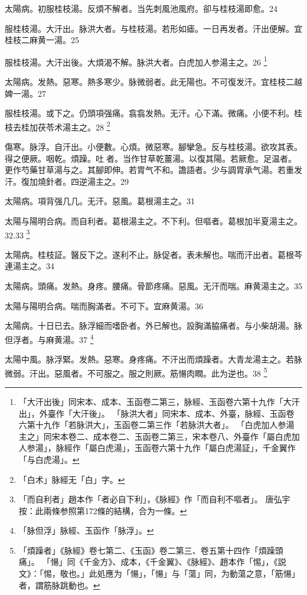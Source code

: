 太陽病。初服桂枝湯。反煩不解者。当先刺風池風府。卻与桂枝湯即愈。24

服桂枝湯。大汗出。脉洪大者。与桂枝湯。若形如瘧。一日再发者。汗出便解。宜桂枝二麻黄一湯。25

%

服桂枝湯。大汗出{\khaaitp 後}。大煩渴不解。脉洪大者。白虎{\khaaitp 加人参}湯主之。26
	\footnote{
		「大汗出後」同宋本、成本、玉函卷二第三，脉經、玉函卷六第十九作「大汗出」，外臺作「大汗後」。
		「脉洪大者」同宋本、成本、外臺，脉經、玉函卷六第十九作「若脉洪大」，玉函卷二第三作「若脉洪大者」。
		「白虎加人参湯主之」同宋本卷二、成本卷二、玉函卷二第三，宋本卷八、外臺作「屬白虎加人参湯」，脉經作「屬白虎湯」，玉函卷六第十九作「屬白虎湯証」，千金翼作「与白虎湯」。
	}

太陽病。发熱。惡寒。熱多寒少。脉微弱者。此无陽也。不可{\khaaitp 復}发汗。{\khaaitp 宜桂枝二越婢一湯。}27

服桂枝湯。{\khaaitp 或}下之。仍頭項强痛。翕翕发熱。无汗。心下滿。微痛。小便不利。桂枝去桂加茯苓术湯主之。28
	\footnote{
		「白术」脉經无「白」字。
	}

傷寒。脉浮。自汗出。小便數。心煩。微惡寒。腳攣急。反与桂枝湯。欲攻其表。得之便厥。咽乾。煩躁。吐{\sungtpii 𠱘}者。当作甘草乾薑湯。以復其陽。若厥愈。足温者。更作芍藥甘草湯与之。其腳即伸。若胃气不和。譫語者。少与{\khaaitp 調胃}承气湯。若重发汗。復加燒針者。四逆湯主之。29

太陽病。項背强几几。无汗。惡風。葛根湯主之。31

太陽与陽明合病。而自利{\khaaitp 者}。葛根湯主之。不下利。但嘔者。葛根加半夏湯主之。32.33
	\footnote{
		「而自利者」趙本作「者必自下利」，《脉經》作「而自利不嘔者」。
		唐弘宇按：此兩條参照第172條的結構，合为一條。
	}

太陽病。桂枝証。醫反下之。遂利不止。脉促者。表未解也。喘而汗出者。葛根芩連湯主之。34

太陽病。頭痛。发熱。身疼。腰痛。骨節疼痛。惡風。无汗而喘。麻黄湯主之。35

太陽与陽明合病。喘而胸滿者。不可下。宜麻黄湯。36

太陽病。十日已去。脉浮細而嗜卧者。外已解也。設胸滿脇痛者。与小柴胡湯。脉{\khaaitp 但}浮者。与麻黄湯。37
	\footnote{
		「脉但浮」脉經、玉函作「脉浮」。
	}

太陽中風。脉浮緊。发熱。惡寒。身疼痛。不汗出而煩躁者。大青龙湯主之。若脉微弱。汗出。惡風者。不可服之。服之則厥。筋愓肉瞤。此为逆也。38
	\footnote{
		「煩躁者」《脉經》卷七第二、《玉函》卷二第三、卷五第十四作「煩躁頭痛」。
		「愓」同《千金方》、成本，《千金翼》、《脉經》、趙本作「惕」，《説文》：「惕，敬也。」此処應为「愓」，「愓」与「蕩」同，为動蕩之意，「筋愓」者，謂筋脉跳動也。
	}


